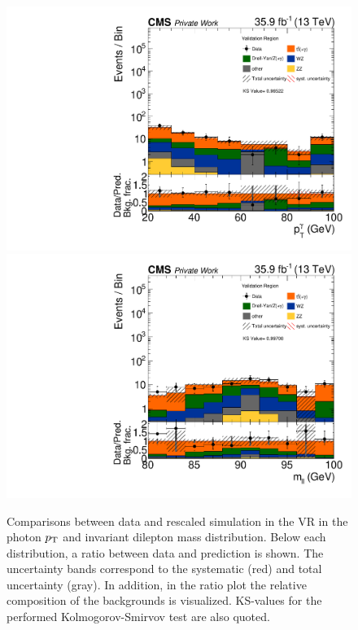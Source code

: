\begin{figure}[tbp]
 \centering
 \includegraphics[width=\pairwidth]{figures/plots_VR/VR_LL_pt_g1_log}
 \includegraphics[width=\pairwidth]{figures/plots_VR/VR_LL_m_ll_log}
 \caption{Comparisons between data and rescaled simulation in the VR in the photon $p_{\mathrm{T}}$ and invariant dilepton mass distribution. Below each distribution, a ratio between data and prediction is shown. The uncertainty bands correspond to the systematic (red) and total uncertainty (gray). In addition, in the ratio plot the relative composition of the backgrounds is visualized. KS-values for the performed Kolmogorov-Smirvov test are also quoted.}
 \label{fig:VR2}
\end{figure}


